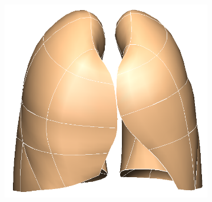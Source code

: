 {\begin{figure}[htbp]
\begin{subfigure}{.4\linewidth}
  \caption{}
  \label{fig:PCAMeshTraining-a} 
\end{subfigure}
\hspace{.3in} %
\begin{subfigure}{.4\linewidth}%
  \includegraphics[width=\linewidth,trim={{.0\wd0} {.0\wd0} {.0\wd0} {.0\wd0}},clip]{Segmentation/Image/PCAAverageModel.png}

\end{subfigure}
\end{figure}}
